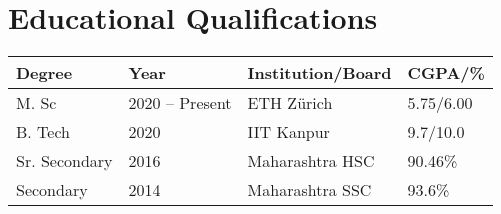 \section*{Educational Qualifications}
\begin{tabulary}{\textwidth}{L L L L}

\toprule
\textbf{Degree} & \textbf{Year} & \textbf{Institution/Board} & \textbf{CGPA/\%}\\
\midrule
M. Sc & 2020 -- Present & ETH Zürich & 5.75/6.00\\%
B. Tech & 2020 & IIT Kanpur & 9.7/10.0\\
Sr. Secondary & 2016 & Maharashtra HSC & 90.46\%\\
Secondary & 2014 & Maharashtra SSC & 93.6\%\\
\bottomrule

\end{tabulary}
